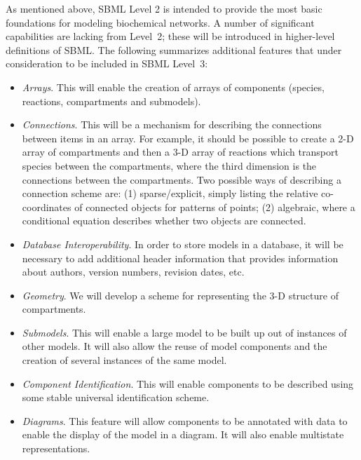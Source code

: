 \documentclass[10pt]{cekarticle}
\begin{document}
As mentioned above, SBML Level 2 is intended to provide the most
basic foundations for modeling biochemical networks.  A number of
significant capabilities are lacking from Level~2; these will be
introduced in higher-level definitions of SBML.  The following
summarizes additional features that under consideration to be
included in SBML Level~3:
\begin{itemize}

\item \emph{Arrays}.  This will enable the creation of arrays of components
  (species, reactions, compartments and submodels).

\item \emph{Connections}.  This will be a mechanism for describing the
  connections between items in an array.  For example, it should be
  possible to create a 2-D array of compartments and then a 3-D array of
  reactions which transport species between the compartments, where the
  third dimension is the connections between the compartments.  Two
  possible ways of describing a connection scheme are: (1) sparse/explicit,
  simply listing the relative co-coordinates of connected objects for
  patterns of points; (2) algebraic, where a conditional equation describes
  whether two objects are connected.

\item \emph{Database Interoperability}.  In order to store models in a
  database, it will be necessary to add additional header information that
  provides information about authors, version numbers, revision dates, etc.

\item \emph{Geometry}.  We will develop a scheme for representing the 3-D
  structure of compartments.

\item \emph{Submodels}.  This will enable a large model to be built up out
  of instances of other models.  It will also allow the reuse of model
  components and the creation of several instances of the same model.

\item \emph{Component Identification}.  This will enable components to be
  described using some stable universal identification scheme.

\item \emph{Diagrams}.  This feature will allow components to be
annotated
  with data to enable the display of the model in a diagram.  It will also
  enable multistate representations.


\end{itemize}
\end{document}
